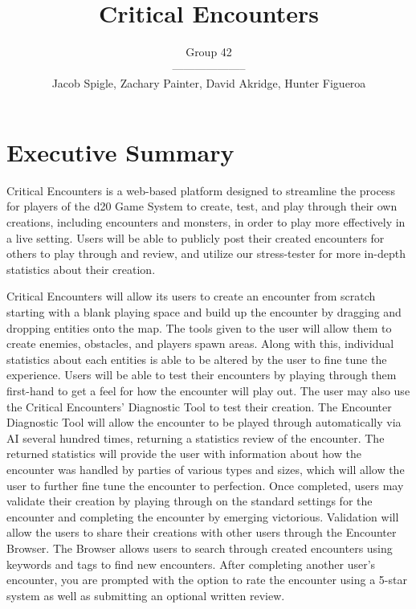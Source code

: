 \documentclass[12pt,a4paper]{report}
\author{Group 42 \\ -------------------- \\Jacob Spigle, Zachary Painter, David Akridge, Hunter Figueroa}
\title{Critical Encounters}
\begin{document}
	
\maketitle

\tableofcontents


	
\newpage

\chapter*{Executive Summary}

Critical Encounters is a web-based platform designed to streamline the process for players of the d20 Game System to create, test, and play through their own creations, including encounters and monsters, in order to play more effectively in a live setting. Users will be able to publicly post their created encounters for others to play through and review, and utilize our stress-tester for more in-depth statistics about their creation.

Critical Encounters will allow its users to create an encounter from scratch starting with a blank playing space and build up the encounter by dragging and dropping entities onto the map. The tools given to the user will allow them to create enemies, obstacles, and players spawn areas. Along with this, individual statistics about each entities is able to be altered by the user to fine tune the experience. Users will be able to test their encounters by playing through them first-hand to get a feel for how the encounter will play out. The user may also use the Critical Encounters' Diagnostic Tool to test their creation. The Encounter Diagnostic Tool will allow the encounter to be played through automatically via AI several hundred times, returning a statistics review of the encounter. The returned statistics will provide the user with information about how the encounter was handled by parties of various types and sizes, which will allow the user to further fine tune the encounter to perfection. Once completed, users may validate their creation by playing through on the standard settings for the encounter and completing the encounter by emerging victorious. Validation will allow the users to share their creations with other users through the Encounter Browser. The Browser allows users to search through created encounters using keywords and tags to find new encounters. After completing another user's encounter, you are prompted with the option to rate the encounter using a 5-star system as well as submitting an optional written review.
\end{document}
